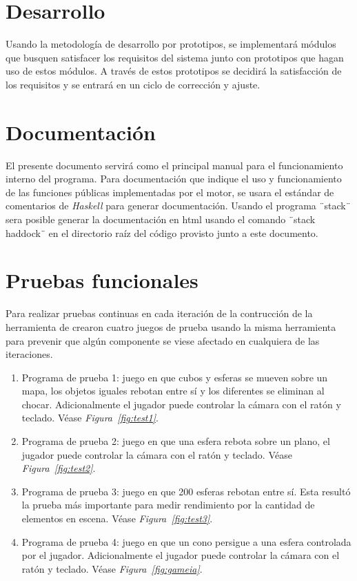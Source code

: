 \section{Desarrollo}

Usando la metodología de desarrollo por prototipos, se implementará módulos que busquen satisfacer los requisitos del sistema junto con prototipos que hagan uso de estos módulos. A través de estos prototipos se decidirá la satisfacción de los requisitos y se entrará en un ciclo de corrección y ajuste.

\section{Documentación}

El presente documento servirá como el principal manual para el funcionamiento interno del programa. Para documentación que indique el uso y funcionamiento de las funciones públicas implementadas por el motor, se usara el estándar de comentarios de \emph{Haskell} para generar documentación. Usando el programa ¨stack¨ sera posible generar la documentación en html usando el comando ¨stack haddock¨ en el directorio raíz del código provisto junto a este documento.

\section{Pruebas funcionales}

Para realizar pruebas continuas en cada iteración de la contrucción de la herramienta de crearon cuatro juegos de prueba usando la misma herramienta para prevenir que algún componente se viese afectado en cualquiera de las iteraciones.

\begin{enumerate}
  \item Programa de prueba 1: juego en que cubos y esferas se mueven sobre un mapa, los objetos iguales rebotan entre sí y los diferentes se eliminan al chocar. Adicionalmente el jugador puede controlar la cámara con el ratón y teclado. Véase \emph{Figura~\ref{fig:test1}}.
  \item Programa de prueba 2: juego en que una esfera rebota sobre un plano, el jugador puede controlar la cámara con el ratón y teclado. Véase \emph{Figura~\ref{fig:test2}}.
  \item Programa de prueba 3: juego en que 200 esferas rebotan entre sí. Esta resultó la prueba más importante para medir rendimiento por la cantidad de elementos en escena. Véase \emph{Figura~\ref{fig:test3}}.
  \item Programa de prueba 4: juego en que un cono persigue a una esfera controlada por el jugador. Adicionalmente el jugador puede controlar la cámara con el ratón y teclado. Véase \emph{Figura~\ref{fig:gameia}}.
\end{enumerate}

